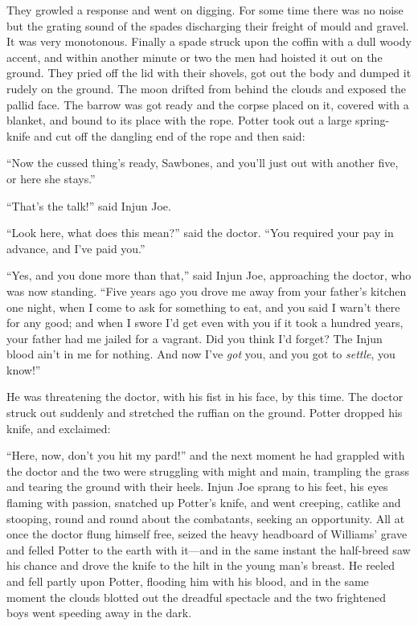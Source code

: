 \documentclass{book}
\begin{document}
They growled a response and went on digging. For some time there was no noise but the grating sound of the spades discharging their freight of mould and gravel. It was very monotonous. Finally a spade struck upon the coffin with a dull woody accent, and within another minute or two the men had hoisted it out on the ground. They pried off the lid with their shovels, got out the body and dumped it rudely on the ground. The moon drifted from behind the clouds and exposed the pallid face. The barrow was got ready and the corpse placed on it, covered with a blanket, and bound to its place with the rope. Potter took out a large spring-knife and cut off the dangling end of the rope and then said:

“Now the cussed thing’s ready, Sawbones, and you’ll just out with another five, or here she stays.”

“That’s the talk!” said Injun Joe.

“Look here, what does this mean?” said the doctor. “You required your pay in advance, and I’ve paid you.”

“Yes, and you done more than that,” said Injun Joe, approaching the doctor, who was now standing. “Five years ago you drove me away from your father’s kitchen one night, when I come to ask for something to eat, and you said I warn’t there for any good; and when I swore I’d get even with you if it took a hundred years, your father had me jailed for a vagrant. Did you think I’d forget? The Injun blood ain’t in me for nothing. And now I’ve \emph{got} you, and you got to \emph{settle}, you know!”

He was threatening the doctor, with his fist in his face, by this time. The doctor struck out suddenly and stretched the ruffian on the ground. Potter dropped his knife, and exclaimed:

“Here, now, don’t you hit my pard!” and the next moment he had grappled with the doctor and the two were struggling with might and main, trampling the grass and tearing the ground with their heels. Injun Joe sprang to his feet, his eyes flaming with passion, snatched up Potter’s knife, and went creeping, catlike and stooping, round and round about the combatants, seeking an opportunity. All at once the doctor flung himself free, seized the heavy headboard of Williams’ grave and felled Potter to the earth with it—and in the same instant the half-breed saw his chance and drove the knife to the hilt in the young man’s breast. He reeled and fell partly upon Potter, flooding him with his blood, and in the same moment the clouds blotted out the dreadful spectacle and the two frightened boys went speeding away in the dark.
\end{document}
